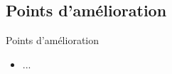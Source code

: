 \subsection{Points d'amélioration}
\label{sec:Points d'amélioration}

\begin{frame}[c]{Points d'amélioration}
  \begin{itemize}
    \item ...
  \end{itemize}
\end{frame}